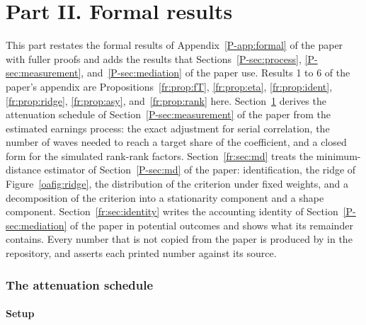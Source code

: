 
\part*{Part II. Formal results}

\noindent This part restates the formal results of Appendix~\ref{P-app:formal} of the paper with fuller proofs and adds the results that
Sections~\ref{P-sec:process}, \ref{P-sec:measurement},
and~\ref{P-sec:mediation} of the paper use. Results 1 to 6 of the paper's appendix are Propositions~\ref{fr:prop:fT}, \ref{fr:prop:eta}, \ref{fr:prop:ident}, \ref{fr:prop:ridge}, \ref{fr:prop:asy}, and~\ref{fr:prop:rank} here.
Section~\ref{fr:sec:atten} derives the attenuation schedule of
Section~\ref{P-sec:measurement} of the paper from the estimated earnings
process: the exact adjustment for serial correlation, the number of waves
needed to reach a target share of the coefficient, and a closed form for
the simulated rank-rank factors. Section~\ref{fr:sec:md} treats the
minimum-distance estimator of Section~\ref{P-sec:md} of the paper:
identification, the ridge of Figure~\ref{oafig:ridge}, the
distribution of the criterion under fixed weights, and a decomposition of
the criterion into a stationarity component and a shape component.
Section~\ref{fr:sec:identity} writes the accounting identity of
Section~\ref{P-sec:mediation} of the paper in potential outcomes and shows
what its remainder contains. Every number that is not copied from the
paper is produced by  in the
repository, and  asserts each
printed number against its source.

\section{The attenuation schedule}
\label{fr:sec:atten}

\subsection{Setup}

